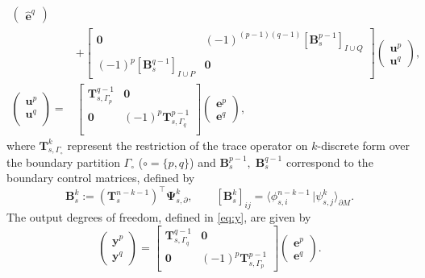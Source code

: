 \documentclass{elsarticle}
\newcommand*{\dual}[1]{\ensuremath{\widehat{#1}}}
\newcommand{\dualpr}[3][]{\ensuremath{\langle #2 \, \vert #3 \rangle_{#1}}}
\begin{document}
\begin{equation}
\begin{aligned}
\begin{pmatrix}
    \dual{\mathbf{e}}^q
    \end{pmatrix} \\
    &+
    \begin{bmatrix}
        \mathbf{0} & (-1)^{(p-1)(q-1)}[\mathbf{B}_{s}^{p-1}]_{I\cup Q} \\
        (-1)^{p}[\mathbf{B}^{q-1}_{s}]_{I \cup P} & \mathbf{0}
    \end{bmatrix}
    \begin{pmatrix}
    {\mathbf{u}}^p \\
    {\mathbf{u}}^q
    \end{pmatrix}, \\
    \begin{pmatrix}
    \mathbf{u}^p \\
    \mathbf{u}^q \\
    \end{pmatrix} = &
    \begin{bmatrix}
    \mathbf{T}^{q-1}_{s, \Gamma_p} & \mathbf{0} \\
    \mathbf{0} & (-1)^p\mathbf{T}^{p-1}_{s, \Gamma_q} \\
    \end{bmatrix}
    \begin{pmatrix}
    \mathbf{e}^p \\
    \mathbf{e}^q
    \end{pmatrix}, 
\end{aligned}
\end{equation}
where $\mathbf{T}^k_{s, \Gamma_\circ}$ represent the restriction of the trace operator on $k$-discrete form over the boundary partition $\Gamma_\circ$ ($\circ =\{p, q\}$) and $\mathbf{B}_{s}^{p-1}, \; \mathbf{B}^{q-1}_{s}$ correspond to the boundary control matrices, defined by
\begin{equation}\label{eq:control_mat}
    \mathbf{B}^{k}_s := (\mathbf{T}^{n-k-1}_s)^\top \mathbf{\Psi}^{k}_{s, \partial}, \qquad [\mathbf{B}^{k}_s]_{ij} = \dualpr[\partial M]{\phi_{s, i}^{n-k-1}}{\psi^{k}_{s, j}}.
\end{equation}
The output degrees of freedom, defined in \eqref{eq:y}, are given by
\begin{equation}
    \begin{pmatrix}
    \mathbf{y}^p \\
    \mathbf{y}^q
    \end{pmatrix} = 
    \begin{bmatrix}
    \mathbf{T}^{q-1}_{s, \Gamma_q} & \mathbf{0}\\
    \mathbf{0} & (-1)^p \mathbf{T}^{p-1}_{s, \Gamma_p}
    \end{bmatrix}
    \begin{pmatrix}
    \mathbf{e}^p \\
    \mathbf{e}^q
    \end{pmatrix}.
\end{equation}
\end{document}

